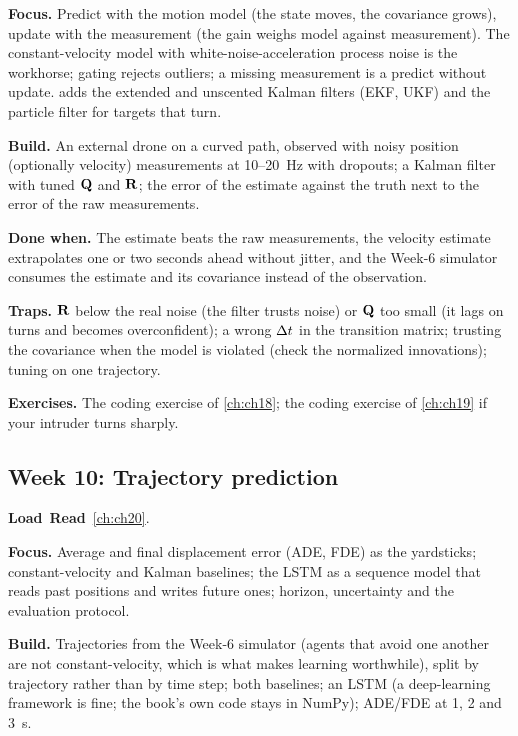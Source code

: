 \textbf{Focus.} Predict with the motion model (the state moves, the covariance grows),
update with the measurement (the gain weighs model against measurement). The
constant-velocity model with white-noise-acceleration process noise is the workhorse; gating
rejects outliers; a missing measurement is a predict without update.  adds
the extended and unscented Kalman filters (EKF, UKF) and the particle filter for targets
that turn.

\textbf{Build.} An external drone on a curved path, observed with noisy position (optionally
velocity) measurements at 10--20~Hz with dropouts; a Kalman filter with tuned $\mathbf{Q}$ and
$\mathbf{R}$; the error of the estimate against the truth next to the error of the raw
measurements.

\textbf{Done when.} The estimate beats the raw measurements, the velocity estimate
extrapolates one or two seconds ahead without jitter, and the Week-6 simulator consumes the
estimate and its covariance instead of the observation.

\textbf{Traps.} $\mathbf{R}$ below the real noise (the filter trusts noise) or $\mathbf{Q}$ too
small (it lags on turns and becomes overconfident); a wrong $\Delta t$ in the transition matrix;
trusting the covariance when the model is violated (check the normalized innovations);
tuning on one trajectory.

\textbf{Exercises.} The coding exercise of \cref{ch:ch18}; the coding exercise of
\cref{ch:ch19} if your intruder turns sharply.

\subsection{Week 10: Trajectory prediction}
\label{sec:appA-week10}
\noindent\textbf{Load}\ \quad\textbf{Read}\ \cref{ch:ch20}.

\textbf{Focus.} Average and final displacement error (ADE, FDE) as the yardsticks;
constant-velocity and Kalman baselines; the LSTM as a sequence model that reads past
positions and writes future ones; horizon, uncertainty and the evaluation protocol.

\textbf{Build.} Trajectories from the Week-6 simulator (agents that avoid one another are
not constant-velocity, which is what makes learning worthwhile), split by trajectory rather
than by time step; both baselines; an LSTM (a deep-learning framework is fine; the book's
own code stays in NumPy); ADE/FDE at 1, 2 and 3~s.

